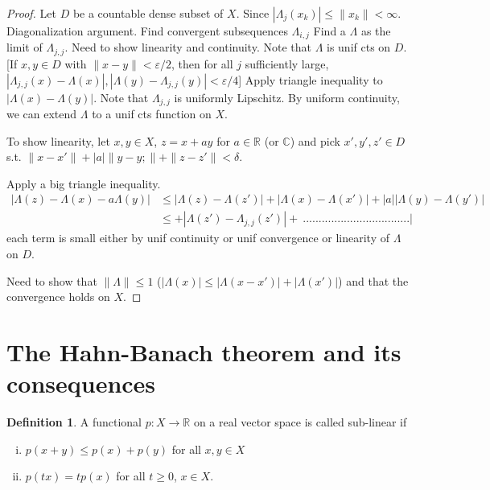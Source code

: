 \documentclass{article}
\theoremstyle{definition}
\newtheorem{defn}{Definition}[section]
\theoremstyle{remark}
\theoremstyle{plain}
\newcommand{\RR}{\mathbb{R}}
\newcommand{\CC}{\mathbb{C}}
\begin{document}
\begin{proof}
    Let $D$ be a countable dense subset of $X$. Since $|\Lambda_j(x_k)|\le\|x_k\|<\infty$. Diagonalization argument. Find convergent subsequences $\Lambda_{i,j}$ Find a $\Lambda$ as the limit of $\Lambda_{j,j}$. Need to show linearity and continuity. Note that $\Lambda$ is unif cts on $D$. [If $x,y\in D$ with $\|x-y\|<\varepsilon/2$, then for all $j$ sufficiently large, $|\Lambda_{j,j}(x)-\Lambda(x)|,|\Lambda(y)-\Lambda_{j,j}(y)|<\varepsilon/4$] Apply triangle inequality to $|\Lambda(x)-\Lambda(y)|$. Note that $\Lambda_{j,j}$ is uniformly Lipschitz.
    By uniform continuity, we can extend $\Lambda$ to a unif cts function on $X$.

    To show linearity, let $x,y\in X$, $z=x+ay$ for $a\in\RR$ (or $\CC$) and pick $x',y',z'\in D$ s.t. $\|x-x'\|+|a|\|y-y;\|+\|z-z'\|<\delta$.

    Apply a big triangle inequality.
    \begin{align*}
        |\Lambda(z)-\Lambda(x)-a\Lambda(y)|&\le|\Lambda(z)-\Lambda(z')|+|\Lambda(x)-\Lambda(x')|+|a||\Lambda(y)-\Lambda(y')|\\
        &\le +|\Lambda(z')-\Lambda_{j,j}(z')|+\ ..................................|
    \end{align*}
    each term is small either by unif continuity or unif convergence or linearity of $\Lambda$ on $D$.

    Need to show that $\|\Lambda\|\le 1$ ($|\Lambda(x)|\le|\Lambda(x-x')|+|\Lambda(x')|$) and that the convergence holds on $X$.
\end{proof}
\section{The Hahn-Banach theorem and its consequences}
\begin{defn}
    A functional $p:X\to\RR$ on a real vector space is called sub-linear if \begin{enumerate}[(i)]
        \item $p(x+y)\le p(x)+p(y)$ for all $x,y\in X$
        \item $p(tx)=tp(x)$ for all $t\ge 0$, $x\in X$.
    \end{enumerate}
\end{defn}
\end{document}
